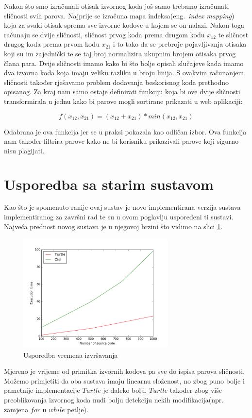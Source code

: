 Nakon što smo izračunali otisak izvornog koda još samo trebamo izračunati sličnosti svih parova. Najprije se izračuna mapa indeksa(eng.~\textit{index mapping}) koja za svaki otisak sprema sve izvorne kodove u kojem se on nalazi. Nakon toga računaju se dvije sličnosti, sličnost prvog koda prema drugom kodu $x_{12}$ te sličnost drugog koda prema prvom kodu $x_{21}$ i to tako da se prebroje pojavljivanja otisaka koji su im zajednički te se taj broj normalizira ukupnim brojem otisaka prvog člana para. Dvije sličnosti imamo kako bi što bolje opisali slučajeve kada imamo dva izvorna koda koja imaju veliku razliku u broju linija. S ovakvim računanjem sličnosti također rješavamo problem dodavanja beskorisnog koda prethodno opisanog.  Za kraj nam samo ostaje definirati funkciju koja bi ove dvije sličnosti transformirala u jednu kako bi parove mogli sortirane prikazati u web aplikaciji:

\begin{equation}
	f(x_{12}, x_{21}) = (x_{12} + x_{21}) * min(x_{12}, x_{21})
\end{equation}

\noindent Odabrana je ova funkcija jer se u praksi pokazala kao odličan izbor. Ova funkcija nam također filtrira parove kako ne bi korisniku prikazivali parove koji sigurno nisu plagijati. 

\section{Usporedba sa starim sustavom}

Kao što je spomenuto ranije ovaj sustav je novo implementirana verzija sustava implementiranog za završni rad te su u ovom poglavlju uspoređeni ti sustavi. Najveća prednost novog sustava je u njegovoj brzini što vidimo na slici \ref{fig:execution_time}.

\begin{figure}[htb]
	\centering
	\includegraphics[width=0.7\textwidth,height=6cm,keepaspectratio]{fig/execution_time.png}
	\caption{Usporedba vremena izvršavanja}
	\label{fig:execution_time}
\end{figure}

\noindent Mjereno je vrijeme od primitka izvornih kodova pa sve do ispisa parova sličnosti. Možemo primjetiti da oba sustava imaju linearnu složenost, no zbog puno bolje i pametnije implementacije $Turtle$ je daleko bolji. $Turtle$ također zbog više preoblikovanja izvornog koda nudi bolju detekciju nekih modifikacija(npr. zamjena $for$ u $while$ petlje).
